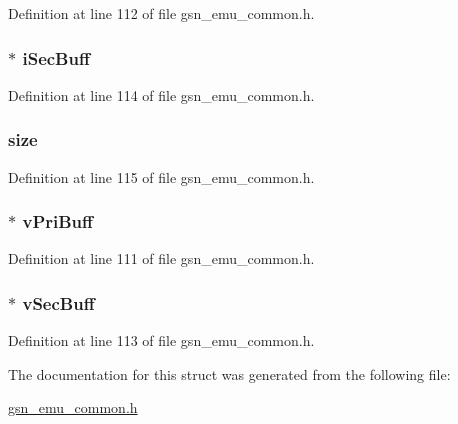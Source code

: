 Definition at line 112 of file gsn\_\-emu\_\-common.h.

\hypertarget{a00067_a144da2d3a7476e0fd4942873b565c233}{
\subsubsection[{iSecBuff}]{$\ast$ {\bf iSecBuff}}}
\label{a00067_a144da2d3a7476e0fd4942873b565c233}


Definition at line 114 of file gsn\_\-emu\_\-common.h.

\hypertarget{a00067_a6d4bac4be8d2f0ee400eb63ac2204aac}{
\subsubsection[{size}]{ {\bf size}}}
\label{a00067_a6d4bac4be8d2f0ee400eb63ac2204aac}


Definition at line 115 of file gsn\_\-emu\_\-common.h.

\hypertarget{a00067_a77083f65d07fe8f75e584d5e26c340f2}{
\subsubsection[{vPriBuff}]{$\ast$ {\bf vPriBuff}}}
\label{a00067_a77083f65d07fe8f75e584d5e26c340f2}


Definition at line 111 of file gsn\_\-emu\_\-common.h.

\hypertarget{a00067_a53f160eb100d781fd2db189568a7dc13}{
\subsubsection[{vSecBuff}]{$\ast$ {\bf vSecBuff}}}
\label{a00067_a53f160eb100d781fd2db189568a7dc13}


Definition at line 113 of file gsn\_\-emu\_\-common.h.



The documentation for this struct was generated from the following file:\begin{DoxyCompactItemize}
\item 
\hyperlink{a00490}{gsn\_\-emu\_\-common.h}\end{DoxyCompactItemize}
